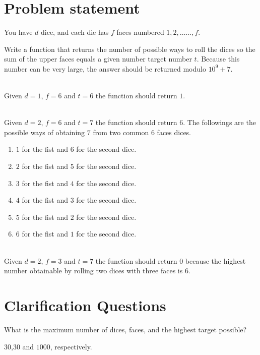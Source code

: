 \section{Problem statement}
\begin{exercise}
You have $d$ dice, and each die has $f$ faces numbered $1, 2, \ldots..., f$.

Write a function that returns the number of possible ways to roll the dices so the sum of the upper
faces equals a given number target number $t$. Because this number can be very large, the answer
should be returned modulo $10^9 + 7$.

	\begin{example}
		\hfill \\
		Given $d=1$, $f=6$ and $t=6$ the function should return $1$.
	\end{example}

	\begin{example}
		\hfill \\
		Given $d=2$, $f=6$ and $t=7$ the function should return $6$. The followings are the possible
		ways of obtaining $7$ from two common $6$ faces dices.
		\begin{enumerate}
			\item $1$ for the fist and $6$ for the second dice.
			\item $2$ for the fist and $5$ for the second dice.
			\item $3$ for the fist and $4$ for the second dice.
			\item $4$  for the fist and $3$ for the second dice.
			\item $5$  for the fist and $2$ for the second dice.
			\item $6$  for the fist and $1$ for the second dice.
		\end{enumerate}
	\end{example}

	\begin{example}
		\hfill \\
		Given $d=2$, $f=3$ and $t=7$ the function should return $0$ because the highest number
		obtainable by rolling two dices with three faces is $6$.
	\end{example}
\end{exercise}

\section{Clarification Questions}

\begin{QandA}
	\item What is the maximum number of dices, faces, and the highest target possible?
	\begin{answered}
		$30$,$30$ and $1000$, respectively.
	\end{answered}
	
\end{QandA}

